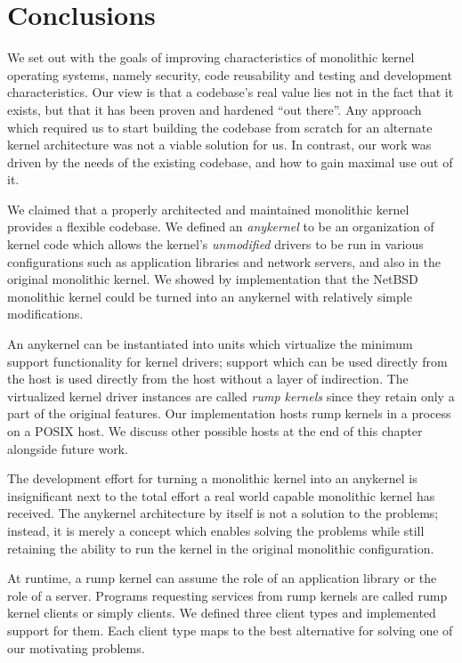 %

\section{Conclusions}
\label{chap:conclusions}

We set out with the goals of improving characteristics of monolithic
kernel operating systems, namely security, code reusability and
testing and development characteristics.  Our view is that a
codebase's real value lies not in the fact that it exists, but that
it has been proven and hardened ``out there''.
Any approach which required us to start building the codebase from
scratch for an alternate kernel architecture was not a viable
solution for us.  In contrast, our work was driven by the needs of
the existing codebase, and how to gain maximal use out of it.

We claimed that a properly architected and maintained monolithic
kernel provides a flexible codebase.  We defined an \textit{anykernel}
to be an organization of kernel code which allows the kernel's
\textit{unmodified} drivers to be run in various configurations
such as application libraries and network servers, and also in the
original monolithic kernel.  We showed by implementation that the
NetBSD monolithic kernel could be turned into an anykernel with
relatively simple modifications.

An anykernel can be instantiated into units which virtualize the
minimum support functionality for kernel drivers; support which can be
used directly from the host is used directly from the host without a
layer of indirection.  The virtualized kernel driver instances
are called \textit{rump kernels} since they retain only a part of the
original features.  Our implementation hosts rump kernels in a process
on a POSIX host.  We discuss other possible hosts at the end of this
chapter alongside future work.

The development effort for turning a monolithic kernel into an
anykernel is insignificant next to the total effort a real world
capable monolithic kernel has received.  The anykernel architecture by
itself is not a solution to the problems; instead, it is merely a concept
which enables solving the problems while still retaining the ability to
run the kernel in the original monolithic configuration.

At runtime, a rump kernel can assume the role of an application library
or the role of a server.  Programs requesting services from rump kernels are
called rump kernel clients or simply clients.  We defined three client
types and implemented support for them.  Each client type maps to the
best alternative for solving one of our motivating problems.

